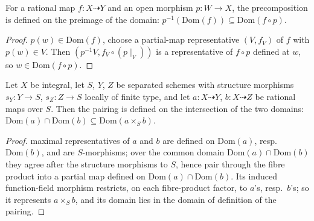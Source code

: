 \begin{lemma}\label{mk-lem:rationalMap_precomp_domain_bound}
  \leanok

  For a rational map \(f \colon X \dashrightarrow Y\) and an open morphism
  \(p \colon W \to X\), the precomposition is defined on the preimage of the domain:
  \(p^{-1}(\mathrm{Dom}(f)) \subseteq \mathrm{Dom}(f \circ p)\).
\end{lemma}
\begin{proof}
  \leanokIf \(p(w) \in \mathrm{Dom}(f)\), choose a partial-map representative \((V, f_V)\) of
  \(f\) with \(p(w) \in V\). Then \((p^{-1}V, f_V \circ (p \mid_V))\) is a representative
  of \(f \circ p\) defined at \(w\), so \(w \in \mathrm{Dom}(f \circ p)\).
\end{proof}

\begin{lemma}\label{mk-lem:rationalMap_prod_domain_bound}
  \leanok

  Let \(X\) be integral, let \(S\), \(Y\), \(Z\) be separated schemes with structure
  morphisms \(s_Y \colon Y \to S\), \(s_Z \colon Z \to S\) locally of finite type, and let
  \(a \colon X \dashrightarrow Y\), \(b \colon X \dashrightarrow Z\) be rational maps over
  \(S\). Then the pairing is defined on the intersection of the two domains:
  \(\mathrm{Dom}(a) \cap \mathrm{Dom}(b) \subseteq \mathrm{Dom}(a \times_S b)\).
\end{lemma}
\begin{proof}
  \leanokThe maximal representatives of \(a\) and \(b\) are defined on \(\mathrm{Dom}(a)\),
  resp.\ \(\mathrm{Dom}(b)\), and are \(S\)-morphisms; over the common domain
  \(\mathrm{Dom}(a) \cap \mathrm{Dom}(b)\) they agree after the structure morphisms to
  \(S\), hence pair through the fibre product into a partial map defined on
  \(\mathrm{Dom}(a) \cap \mathrm{Dom}(b)\). Its induced function-field morphism restricts,
  on each fibre-product factor, to \(a\)'s, resp.\ \(b\)'s; so it represents \(a \times_S
  b\), and its domain lies in the domain of definition of the pairing.
\end{proof}

